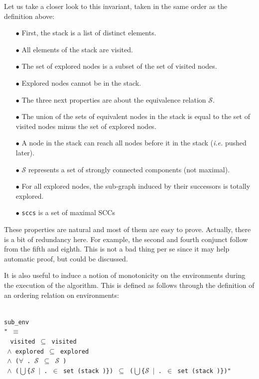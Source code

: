 \documentclass[a4 paper, 12pt]{article}
\newcommand{\where}{{\color{isa_green}{where}}}
\newcommand{\isa}[1]{\small\texttt{\\\noindent#1}}
\newcommand{\blue}[1]{{\color{isa_dark_blue}{#1}}}
\newcommand{\bblue}[1]{{\color{isa_blue}{#1}}}
\newcommand{\green}[1]{{\color{isa_dark_green}{#1}}}
\theoremstyle{definition}
\begin{document}
{Let us take a closer look to this invariant, taken in the same order as the definition above:
\begin{itemize}
    \item[$\bullet$] First, the stack is a list of distinct elements.
    \item[$\bullet$] All elements of the stack are visited.
    \item[$\bullet$] The set of explored nodes is a subset of the set of visited nodes.
    \item[$\bullet$] Explored nodes cannot be in the stack.
    \item[$\bullet$] The three next properties are about the equivalence relation $\mathcal{S}$.
    \item[$\bullet$] The union of the sets of equivalent nodes in the stack is equal to the set of visited nodes minus the set of explored nodes.
    \item[$\bullet$] A node in the stack can reach all nodes before it in the stack (\textit{i.e.} pushed later).
    \item[$\bullet$] $\mathcal{S}$ represents a set of strongly connected components (not maximal).
    \item[$\bullet$] For all explored nodes, the sub-graph induced by their successors is totally explored.
    \item[$\bullet$] \texttt{sccs} is a set of maximal SCCs
\end{itemize}
\noindent
These properties are natural and most of them are easy to prove. Actually, there is a bit of redundancy here. For example, the second and fourth conjunct follow from the fifth and eighth. This is not a bad thing per se since it may help automatic proof, but could be discussed.

\BlankLine
\BlankLine

It is also useful to induce a notion of monotonicity on the environments during the execution of the algorithm. This is defined as follows through the definition of an ordering relation on environments:

\isa{
\bblue{definition} sub\_env \where\\
"\blue{sub\_env} \green{e e'} $\equiv$\\
$~~~~$visited \green{e} $\subseteq$ visited \green{e'}\\
$~~$$\wedge$ explored \green{e} $\subseteq$ explored \green{e'}\\
$~~$$\wedge$ ($\forall$ \green{v}. $\mathcal{S}$ \green{e v} $\subseteq$ $\mathcal{S}$ \green{e' v})\\
$~~$$\wedge$ ($\bigcup$\{$\mathcal{S}$ \green{e v} $|$ \green{v}. \green{v} $\in$ set (stack \green{e})\}) $\subseteq$ ($\bigcup$\{$\mathcal{S}$ \green{e' v} $|$ \green{v}. \green{v} $\in$ set (stack \green{e'})\})"
}

}
\end{document}
